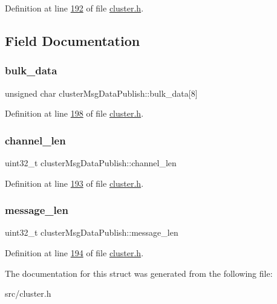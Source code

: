 Definition at line \hyperlink{cluster_8h_source_l00192}{192} of file \hyperlink{cluster_8h_source}{cluster.\+h}.



\subsection{Field Documentation}
\mbox{\label{structclusterMsgDataPublish_a09627cf21fa82796a35abc80ab722afa}} 
\subsubsection{\texorpdfstring{bulk\+\_\+data}{bulk\_data}}
{\footnotesize\ttfamily unsigned char cluster\+Msg\+Data\+Publish\+::bulk\+\_\+data\mbox{[}8\mbox{]}}



Definition at line \hyperlink{cluster_8h_source_l00198}{198} of file \hyperlink{cluster_8h_source}{cluster.\+h}.

\mbox{\label{structclusterMsgDataPublish_a278c4b7d83c96df2d56b7997e35daad3}} 
\subsubsection{\texorpdfstring{channel\+\_\+len}{channel\_len}}
{\footnotesize\ttfamily uint32\+\_\+t cluster\+Msg\+Data\+Publish\+::channel\+\_\+len}



Definition at line \hyperlink{cluster_8h_source_l00193}{193} of file \hyperlink{cluster_8h_source}{cluster.\+h}.

\mbox{\label{structclusterMsgDataPublish_a409a267a5fe003303c9380ed3ff2f2e5}} 
\subsubsection{\texorpdfstring{message\+\_\+len}{message\_len}}
{\footnotesize\ttfamily uint32\+\_\+t cluster\+Msg\+Data\+Publish\+::message\+\_\+len}



Definition at line \hyperlink{cluster_8h_source_l00194}{194} of file \hyperlink{cluster_8h_source}{cluster.\+h}.



The documentation for this struct was generated from the following file\+:\begin{DoxyCompactItemize}
\item 
src/cluster.\+h\end{DoxyCompactItemize}
